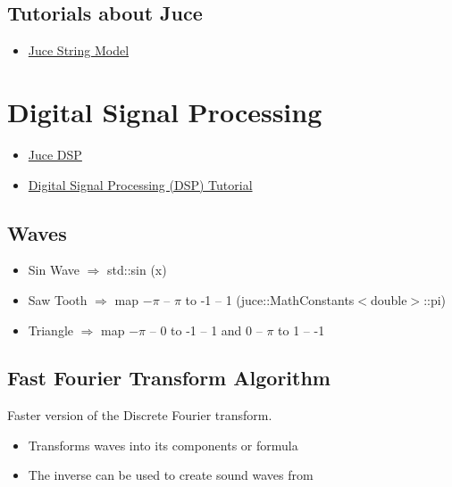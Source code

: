 \documentclass{article}
\begin{document}
	 
	 \subsection{Tutorials about Juce}
	 \begin{itemize}
	 	\item \href{https://docs.juce.com/master/tutorial_dsp_delay_line.html}{Juce String Model}
	 \end{itemize}

\section{Digital Signal Processing}
	\begin{itemize}
		\item \href{https://docs.juce.com/master/tutorial_dsp_introduction.html}{Juce DSP}
		\item \href{https://www.youtube.com/watch?v=HJ_-5mqUZ70}{Digital Signal Processing (DSP) Tutorial}
	\end{itemize}

	
	\subsection{Waves}
	\begin{itemize}
		\item Sin Wave $\Rightarrow$ std::sin (x)
		\item Saw Tooth $\Rightarrow$ map $-\pi$ -- $\pi$ to -1 -- 1 (juce::MathConstants$<$double$>$::pi)
		\item Triangle $\Rightarrow$ map $-\pi$ -- 0 to -1 -- 1 and 0 -- $\pi$ to 1 -- -1
	\end{itemize}
	

	\subsection{Fast Fourier Transform Algorithm}
	Faster version of the Discrete Fourier transform.
	\begin{itemize}
		\item Transforms waves into its components or formula
		\item The inverse can be used to create sound waves from 
	\end{itemize}
	
\end{document}
